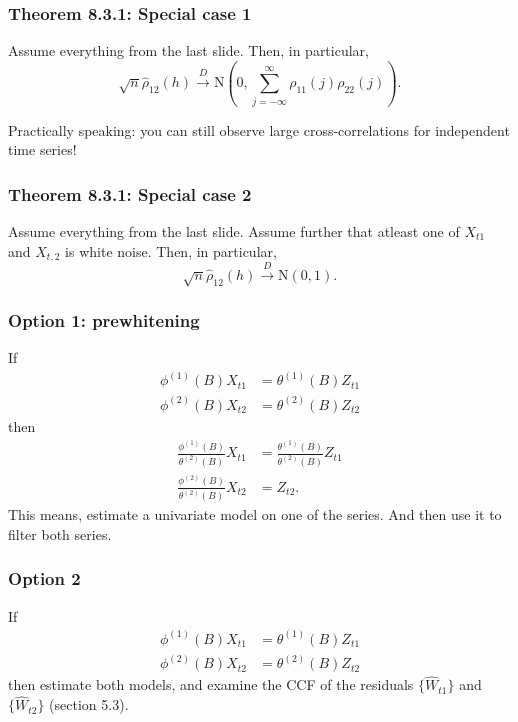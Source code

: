 \documentclass{beamer}
\begin{document}
\begin{frame}
\frametitle{Theorem 8.3.1: Special case 1}

Assume everything from the last slide. Then, in particular,
\[
\sqrt{n}\hat{\rho}_{12}(h) \overset{D}{\to} \text{N}\left(0, \sum_{j=-\infty}^{\infty} \rho_{11}(j)\rho_{22}(j) \right).
\]

Practically speaking: you can still observe large cross-correlations for independent time series!

\end{frame}


\begin{frame}
\frametitle{Theorem 8.3.1: Special case 2}

Assume everything from the last slide. Assume further that atleast one of $X_{t1}$ and $X_{t,2}$ is white noise. Then, in particular,
\[
\sqrt{n}\hat{\rho}_{12}(h) \overset{D}{\to} \text{N}\left(0, 1 \right).
\]


\end{frame}


\begin{frame}
\frametitle{Option 1: prewhitening}

If
\begin{align*}
\phi^{(1)}(B)X_{t1} &= \theta^{(1)}(B)Z_{t1} \\
\phi^{(2)}(B)X_{t2} &= \theta^{(2)}(B)Z_{t2} 
\end{align*}
then
\begin{align*}
\frac{\phi^{(1)}(B)}{\theta^{(2)}(B)} X_{t1} &= \frac{\theta^{(1)} (B) }{\theta^{(2)} (B) } Z_{t1} \\
\frac{\phi^{(2)}(B) }{\theta^{(2)}(B)}X_{t2} &= Z_{t2} .
\end{align*}
This means, estimate a univariate model on one of the series. And then use it to filter both series.




\end{frame}


\begin{frame}
\frametitle{Option 2}

If
\begin{align*}
\phi^{(1)}(B)X_{t1} &= \theta^{(1)}(B)Z_{t1} \\
\phi^{(2)}(B)X_{t2} &= \theta^{(2)}(B)Z_{t2} 
\end{align*}
then estimate both models, and examine the CCF of the residuals $\{\hat{W}_{t1}\}$ and $\{\hat{W}_{t2}\}$ (section 5.3). 



\end{frame}
\end{document}
